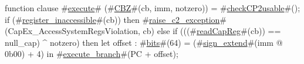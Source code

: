function clause #\hyperref[zexecute]{execute}# (#\hyperref[zCBZ]{CBZ}#(cb, imm, notzero)) =
{
  #\hyperref[zcheckCPtwousable]{checkCP2usable}#();
  if (#\hyperref[zregisterzyinaccessible]{register\_inaccessible}#(cb)) then
    #\hyperref[zraisezyctwozyexception]{raise\_c2\_exception}#(CapEx_AccessSystemRegsViolation, cb)
  else if (((#\hyperref[zreadCapReg]{readCapReg}#(cb)) == null_cap) ^ notzero) then
    {
      let offset : #\hyperref[zbits]{bits}#(64) = (#\hyperref[zsignzyextend]{sign\_extend}#(imm @ 0b00) + 4) in
      #\hyperref[zexecutezybranch]{execute\_branch}#(PC + offset);
    }
}
